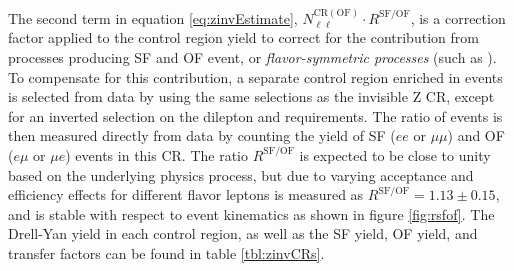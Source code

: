 The second term in equation \ref{eq:zinvEstimate}, $N_{\ell\ell}^{\mathrm{CR(OF)}}\cdot R^{\mathrm{SF/OF}}$, is a correction factor applied to the control region yield to correct for the contribution from processes producing SF and OF event, or {\it flavor-symmetric processes} (such as \ttbar). To compensate for this contribution, a separate control region enriched in \ttbar events is selected from data by using the same selections as the invisible Z CR, except for an inverted selection on the dilepton \pt and \mll requirements. The ratio of \ttbar events is then measured directly from data by counting the yield of SF ($ee$ or $\mu\mu$) and OF ($e\mu$ or $\mu e$) events in this CR. The ratio $R^{\mathrm{SF/OF}}$ is expected to be close to unity based on the underlying physics process, but due to varying acceptance and efficiency effects for different flavor leptons is measured as $R^{\mathrm{SF/OF}} = 1.13 \pm 0.15$, and is stable with respect to event kinematics as shown in figure \ref{fig:rsfof}. The Drell-Yan yield in each control region, as well as the SF yield, OF yield, and transfer factors can be found in table \ref{tbl:zinvCRs}.
